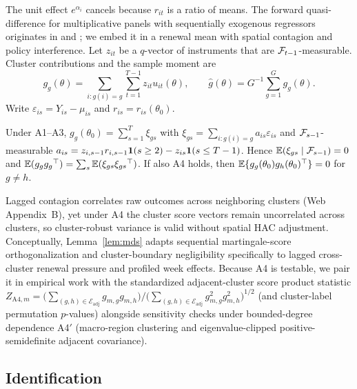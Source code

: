 The unit effect $e^{\alpha_i}$ cancels because $r_{it}$ is a ratio of means. The forward
quasi-difference for multiplicative panels with sequentially exogenous regressors originates in
\citet{wooldridge1997multiplicative} and \citet{windmeijer2000moment}; we embed it in a renewal mean
with spatial contagion and policy interference. Let $z_{it}$ be a $q$-vector of instruments that are
$\mathcal{F}_{t-1}$-measurable. Cluster contributions and the sample moment are
\[
g_g(\theta)=\sum_{i:g(i)=g}\sum_{t=1}^{T-1} z_{it}u_{it}(\theta),\qquad
\hat g(\theta)=G^{-1}\sum_{g=1}^{G}g_g(\theta).
\]
Write $\varepsilon_{is}=Y_{is}-\mu_{is}$ and $r_{is}=r_{is}(\theta_0)$.

\begin{lemma}
\label{lem:mds}
Under A1--A3, $g_g(\theta_0)=\sum_{s=1}^{T}\xi_{gs}$ with $\xi_{gs}=\sum_{i:g(i)=g}a_{is}\varepsilon_{is}$
and $\mathcal{F}_{s-1}$-measurable $a_{is}=z_{i,s-1}r_{i,s-1}\mathbf{1}(s\ge 2)-z_{is}\mathbf{1}(s\le T-1)$.
Hence $\mathbb{E}(\xi_{gs}\mid\mathcal{F}_{s-1})=0$ and $\mathbb{E}(g_gg_g{}^{\top})=\sum_{s}\mathbb{E}(\xi_{gs}\xi_{gs}{}^{\top})$. If
also A4 holds, then $\mathbb{E}\{g_g(\theta_0)g_h(\theta_0)^{\top}\}=0$ for $g\ne h$.
\end{lemma}

Lagged contagion correlates raw outcomes across neighboring clusters (Web Appendix~B), yet under A4
the cluster score vectors remain uncorrelated across clusters, so cluster-robust variance is valid
without spatial HAC adjustment. Conceptually, Lemma~\ref{lem:mds} adapts sequential martingale-score
orthogonalization \citep{bong2024frequentist} and cluster-boundary negligibility \citep{bester2011inference}
specifically to lagged cross-cluster renewal pressure and profiled week effects. Because A4 is testable,
we pair it in empirical work with the standardized adjacent-cluster score product statistic
$Z_{\mathrm{A4},m}=\bigl(\sum_{(g,h)\in\mathcal E_{\mathrm{adj}}} g_{m,g}g_{m,h}\bigr) / \bigl(\sum_{(g,h)\in\mathcal E_{\mathrm{adj}}} g_{m,g}^2 g_{m,h}^2\bigr)^{1/2}$
(and cluster-label permutation $p$-values) alongside sensitivity checks under bounded-degree dependence A4$'$
(macro-region clustering and eigenvalue-clipped positive-semidefinite adjacent covariance).

\subsection{Identification}
\label{ss:ident}

